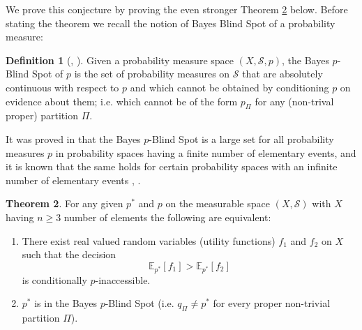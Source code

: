 \documentclass[10pt, letterpaper]{article}%
\theoremstyle{definition}
\newtheorem{theorem}{Theorem}[section]
\newtheorem{definition}[theorem]{Definition}
\newcommand{\E}{\mathbb E}
\newcommand{\1}{\mathbf 1}
\begin{document}
We prove this conjecture by proving the even stronger Theorem \ref{thm:main1} below. Before stating the theorem we recall the notion of Bayes Blind Spot of a probability measure:
\begin{definition}[\cite{GyenisZ-RedeiBayes-General}, \cite{GyenisZ-Redei-Bayes-BlindSpot-Synthese}]
Given a probability measure space $(X,\mathcal{S}, p)$, the Bayes $p$-Blind Spot of $p$ is the set of probability measures on $\mathcal{S}$ that are absolutely continuous with respect to $p$ and which cannot be obtained by conditioning $p$ on evidence about them; i.e. which cannot be of the form $p_{\Pi}$ for any (non-trival proper) partition $\Pi$.   
\end{definition}
It was proved in  \cite{GyenisZ-Redei-Bayes-BlindSpot-Synthese} that the Bayes $p$-Blind Spot is a large set for all probability measures $p$ in probability spaces having a finite number of elementary events, and it is known that the same holds for certain probability spaces with an infinite number of elementary events  \cite{GyenisZ-RedeiBayes-General}, \cite{Shattuck-Wagner2024}. 
\begin{theorem}\label{thm:main1}
	For any given $p^*$ and $p$ on the measurable space $(X,\mathcal{S})$ with $X$ having $n\geq 3$ number of elements the following are equivalent:
	\begin{enumerate}
		\item[(A)] There exist real valued random variables (utility functions) $f_1$ and $f_2$ on $X$ such that the decision 
        \begin{equation}\label{eq:decision-in proof}
        \E_{p^*}[f_1]>\E_{p^*}[f_2]    
        \end{equation}  
        is conditionally $p$-inaccessible.
		\item[(B)] $p^*$ is in the Bayes $p$-Blind Spot (i.e. $q_\Pi\neq p^*$ for every proper non-trivial partition $\Pi$).
	\end{enumerate}	
\end{theorem}
\end{document}
